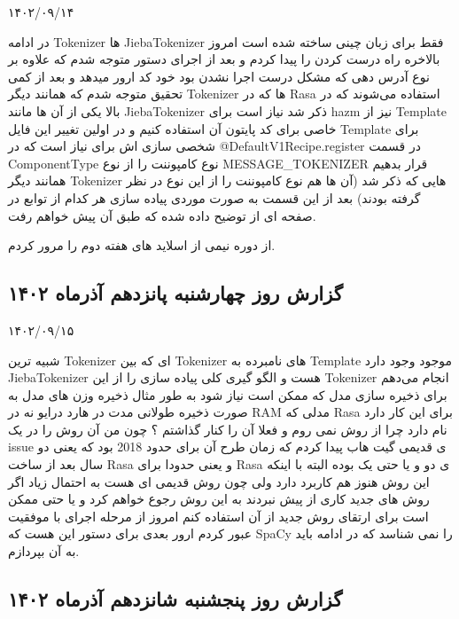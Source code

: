 ۱۴۰۲/۰۹/۱۴

در ادامه Tokenizer ها JiebaTokenizer فقط برای زبان چینی ساخته شده است 
امروز بالاخره راه درست کردن  را پیدا کردم و بعد از اجرای دستور  متوجه شدم که علاوه بر نوع آدرس دهی که مشکل درست اجرا نشدن  بود خود کد  ارور میدهد و بعد از کمی تحقیق متوجه شدم که همانند دیگر Tokenizer ها که در Rasa استفاده می‌شوند که در بالا یکی از آن ها مانند JiebaTokenizer  ذکر شد نیاز است برای hazm نیز از Template خاصی برای کد پایتون آن استفاده کنیم و در اولین تغییر این فایل Template برای شخصی سازی اش برای  نیاز است که 
در @DefaultV1Recipe.register 
در قسمت ComponentType نوع کامپوننت را از نوع MESSAGE\_TOKENIZER قرار بدهیم همانند دیگر Tokenizer هایی که ذکر شد (آن ها هم نوع کامپوننت را از این نوع در نظر گرفته بودند)
بعد از این قسمت به صورت موردی پیاده سازی هر کدام از توابع در صفحه ای از  توضیح داده شده که طبق آن پیش خواهم رفت.

از دوره  نیمی از اسلاید های هفته دوم را مرور کردم.



\subsection{گزارش روز چهارشنبه پانزدهم آذر‌ماه ۱۴۰۲}

۱۴۰۲/۰۹/۱۵

شبیه ترین Tokenizer ای که بین Tokenizer های نامبرده به Template موجود وجود دارد JiebaTokenizer هست و الگو گیری کلی پیاده سازی  را از این Tokenizer انجام می‌دهم 
برای ذخیره سازی مدل که ممکن است نیاز شود به طور مثال ذخیره وزن های مدل به صورت ذخیره طولانی مدت در هارد درایو نه در RAM مدلی که Rasa برای این کار دارد  نام دارد
چرا از روش  نمی روم و فعلا آن را کنار گذاشتم ؟ چون من آن روش را در یک issue ی قدیمی گیت هاب پیدا کردم که زمان طرح آن برای حدود 2018 بود که یعنی دو سال بعد از ساخت Rasa و یعنی حدودا برای Rasa ی دو و یا حتی یک بوده البته با اینکه این روش هنوز هم کاربرد دارد ولی چون روش قدیمی ای هست به احتمال زیاد اگر روش های جدید کاری از پیش نبردند به این روش رجوع خواهم کرد و یا حتی ممکن است برای ارتقای روش جدید از آن استفاده کنم
امروز از مرحله اجرای  با موفقیت عبور کردم ارور بعدی برای دستور  این هست که SpaCy را نمی شناسد که در ادامه باید به آن بپردازم.


\subsection{گزارش روز پنجشنبه شانزدهم آذر‌ماه ۱۴۰۲}

